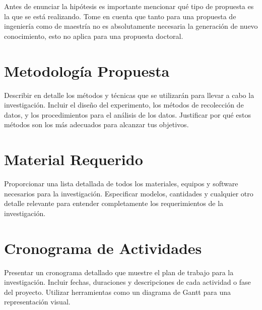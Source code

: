 Antes de enunciar la hipótesis es importante mencionar qué tipo de propuesta es la que se está realizando. Tome en cuenta que tanto para una propuesta de ingeniería como de maestría no es absolutamente necesaria la generación de nuevo conocimiento, esto no aplica para una propuesta doctoral.

\section{Metodología Propuesta}
Describir en detalle los métodos y técnicas que se utilizarán para llevar a cabo la investigación. Incluir el diseño del experimento, los métodos de recolección de datos, y los procedimientos para el análisis de los datos. Justificar por qué estos métodos son los más adecuados para alcanzar tus objetivos.

\section{Material Requerido}
Proporcionar una lista detallada de todos los materiales, equipos y software necesarios para la investigación. Especificar modelos, cantidades y cualquier otro detalle relevante para entender completamente los requerimientos de la investigación.

\section{Cronograma de Actividades}
Presentar un cronograma detallado que muestre el plan de trabajo para la investigación. Incluir fechas, duraciones y descripciones de cada actividad o fase del proyecto. Utilizar herramientas como un diagrama de Gantt para una representación visual.



